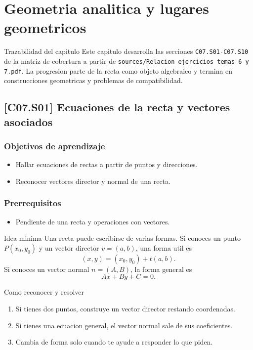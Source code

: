 \chapter{Geometria analitica y lugares geometricos}

\begin{theorybox}{Trazabilidad del capitulo}
Este capitulo desarrolla las secciones \texttt{C07.S01-C07.S10} de la matriz de cobertura a
partir de \texttt{sources/Relacion ejercicios temas 6 y 7.pdf}. La progresion parte de la recta
como objeto algebraico y termina en construcciones geometricas y problemas de compatibilidad.
\end{theorybox}

\section{[C07.S01] Ecuaciones de la recta y vectores asociados}

\subsection*{Objetivos de aprendizaje}
\begin{itemize}
  \item Hallar ecuaciones de rectas a partir de puntos y direcciones.
  \item Reconocer vectores director y normal de una recta.
\end{itemize}

\subsection*{Prerrequisitos}
\begin{itemize}
  \item Pendiente de una recta y operaciones con vectores.
\end{itemize}

\begin{theorybox}{Idea minima}
Una recta puede escribirse de varias formas. Si conoces un punto \(P(x_0,y_0)\) y un vector
director \(v=(a,b)\), una forma util es
\[
(x,y)=(x_0,y_0)+t(a,b).
\]
Si conoces un vector normal \(n=(A,B)\), la forma general es
\[
Ax+By+C=0.
\]
\end{theorybox}

\begin{methodbox}{Como reconocer y resolver}
\begin{enumerate}
  \item Si tienes dos puntos, construye un vector director restando coordenadas.
  \item Si tienes una ecuacion general, el vector normal sale de sus coeficientes.
  \item Cambia de forma solo cuando te ayude a responder lo que piden.
\end{enumerate}
\end{methodbox}

